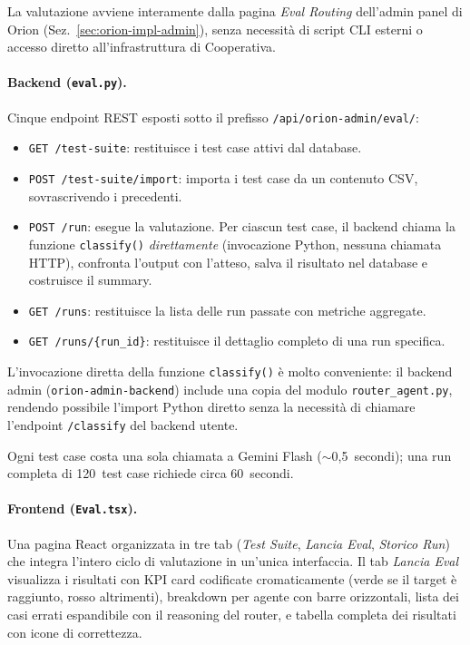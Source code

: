 La valutazione avviene interamente dalla pagina \emph{Eval Routing} dell'admin panel di Orion (Sez.~\ref{sec:orion-impl-admin}), senza necessità di script CLI esterni o accesso diretto all'infrastruttura di Cooperativa.

\paragraph{Backend (\texttt{eval.py}).} Cinque endpoint REST esposti sotto il prefisso \texttt{/api/\allowbreak orion-admin/\allowbreak eval/}:

\begin{itemize}
  \item \texttt{GET /test-suite}: restituisce i test case attivi dal database.
  \item \texttt{POST /test-suite/import}: importa i test case da un contenuto CSV, sovrascrivendo i precedenti.
  \item \texttt{POST /run}: esegue la valutazione. Per ciascun test case, il backend chiama la funzione \texttt{classify()} \emph{direttamente} (invocazione Python, nessuna chiamata HTTP), 
  confronta l'output con l'atteso, salva il risultato nel database e costruisce il summary.
  \item \texttt{GET /runs}: restituisce la lista delle run passate con metriche aggregate.
  \item \texttt{GET /runs/\{run\_id\}}: restituisce il dettaglio completo di una run specifica.
\end{itemize}

L'invocazione diretta della funzione \texttt{classify()} è molto conveniente: 
il backend admin (\texttt{orion-admin-backend}) include una copia del modulo \texttt{router\_agent.py}, 
rendendo possibile l'import Python diretto senza la necessità di chiamare l'endpoint \texttt{/classify} del backend utente. 

Ogni test case costa una sola chiamata a Gemini Flash ($\sim$0,5~secondi); una run completa di 120~test case richiede circa 60~secondi.

\paragraph{Frontend (\texttt{Eval.tsx}).} Una pagina React organizzata in tre tab (\emph{Test Suite}, \emph{Lancia Eval}, \emph{Storico Run}) 
che integra l'intero ciclo di valutazione in un'unica interfaccia. Il tab \emph{Lancia Eval} visualizza i risultati con KPI card codificate cromaticamente 
(verde se il target è raggiunto, rosso altrimenti), breakdown per agente con barre orizzontali, 
lista dei casi errati espandibile con il reasoning del router, e tabella completa dei risultati con icone di correttezza.

